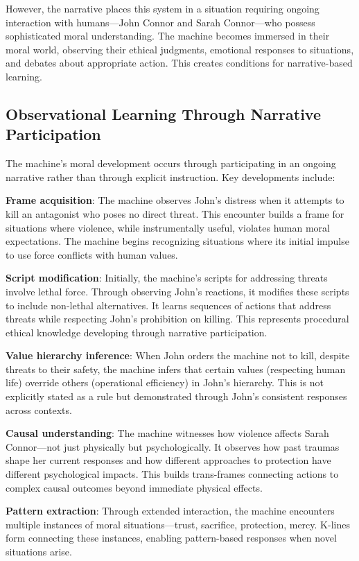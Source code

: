 \documentclass[12pt]{article}
\begin{document}
However, the narrative places this system in a situation requiring ongoing interaction with humans—John Connor and Sarah Connor—who possess sophisticated moral understanding. The machine becomes immersed in their moral world, observing their ethical judgments, emotional responses to situations, and debates about appropriate action. This creates conditions for narrative-based learning.

\subsection{Observational Learning Through Narrative Participation}

The machine's moral development occurs through participating in an ongoing narrative rather than through explicit instruction. Key developments include:

\textbf{Frame acquisition}: The machine observes John's distress when it attempts to kill an antagonist who poses no direct threat. This encounter builds a frame for situations where violence, while instrumentally useful, violates human moral expectations. The machine begins recognizing situations where its initial impulse to use force conflicts with human values.

\textbf{Script modification}: Initially, the machine's scripts for addressing threats involve lethal force. Through observing John's reactions, it modifies these scripts to include non-lethal alternatives. It learns sequences of actions that address threats while respecting John's prohibition on killing. This represents procedural ethical knowledge developing through narrative participation.

\textbf{Value hierarchy inference}: When John orders the machine not to kill, despite threats to their safety, the machine infers that certain values (respecting human life) override others (operational efficiency) in John's hierarchy. This is not explicitly stated as a rule but demonstrated through John's consistent responses across contexts.

\textbf{Causal understanding}: The machine witnesses how violence affects Sarah Connor—not just physically but psychologically. It observes how past traumas shape her current responses and how different approaches to protection have different psychological impacts. This builds trans-frames connecting actions to complex causal outcomes beyond immediate physical effects.

\textbf{Pattern extraction}: Through extended interaction, the machine encounters multiple instances of moral situations—trust, sacrifice, protection, mercy. K-lines form connecting these instances, enabling pattern-based responses when novel situations arise.
\end{document}
